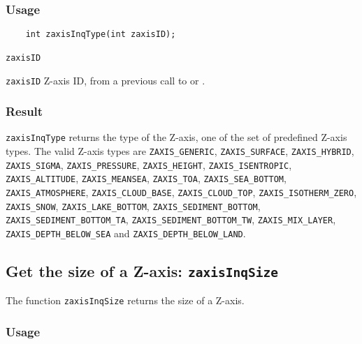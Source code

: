 \subsubsection*{Usage}

\begin{verbatim}
    int zaxisInqType(int zaxisID);
\end{verbatim}

\hspace*{4mm}\begin{minipage}[]{15cm}
\begin{deflist}{\texttt{zaxisID}\ }
\item[\texttt{zaxisID}]
Z-axis ID, from a previous call to {} or {}.

\end{deflist}
\end{minipage}

\subsubsection*{Result}

{\texttt{zaxisInqType}} returns the type of the Z-axis,
one of the set of predefined {\CDI} Z-axis types.
The valid {\CDI} Z-axis types are {\texttt{ZAXIS\_GENERIC}}, {\texttt{ZAXIS\_SURFACE}},
{\texttt{ZAXIS\_HYBRID}}, {\texttt{ZAXIS\_SIGMA}}, {\texttt{ZAXIS\_PRESSURE}}, {\texttt{ZAXIS\_HEIGHT}},
{\texttt{ZAXIS\_ISENTROPIC}}, {\texttt{ZAXIS\_ALTITUDE}}, {\texttt{ZAXIS\_MEANSEA}}, {\texttt{ZAXIS\_TOA}},
{\texttt{ZAXIS\_SEA\_BOTTOM}}, {\texttt{ZAXIS\_ATMOSPHERE}}, {\texttt{ZAXIS\_CLOUD\_BASE}},
{\texttt{ZAXIS\_CLOUD\_TOP}}, {\texttt{ZAXIS\_ISOTHERM\_ZERO}}, {\texttt{ZAXIS\_SNOW}},
{\texttt{ZAXIS\_LAKE\_BOTTOM}}, {\texttt{ZAXIS\_SEDIMENT\_BOTTOM}}, {\texttt{ZAXIS\_SEDIMENT\_BOTTOM\_TA}},
{\texttt{ZAXIS\_SEDIMENT\_BOTTOM\_TW}}, {\texttt{ZAXIS\_MIX\_LAYER}},
{\texttt{ZAXIS\_DEPTH\_BELOW\_SEA}} and {\texttt{ZAXIS\_DEPTH\_BELOW\_LAND}}.



\subsection{Get the size of a Z-axis: \texttt{zaxisInqSize}}
\label{zaxisInqSize}

The function {\texttt{zaxisInqSize}} returns the size of a Z-axis.

\subsubsection*{Usage}

